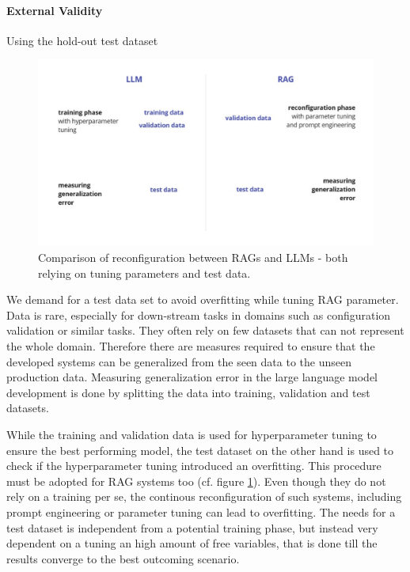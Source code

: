 \paragraph{External Validity}

Using the hold-out test dataset

\begin{figure}
    \centering
    \includegraphics[width=\textwidth]{images/RAGvsLLM-tuning.pdf}
    \caption{Comparison of reconfiguration between RAGs and LLMs - both relying on tuning parameters and test data.}
    \label{fig:tuning}
\end{figure}



We demand for a test data set to avoid overfitting while tuning RAG parameter. Data is rare, especially for down-stream tasks in domains such as configuration validation or similar tasks. They often rely on few datasets that can not represent the whole domain. Therefore there are measures required to ensure that the developed systems can be generalized from the seen data to the unseen production data. Measuring generalization error in the large language model development is done by splitting the data into training, validation and test datasets. 

While the training and validation data is used for hyperparameter tuning to ensure the best performing model, the test dataset on the other hand is used to check if the hyperparameter tuning introduced an overfitting. This procedure must be adopted for RAG systems too (cf. figure \ref{fig:tuning}). Even though they do not rely on a training per se, the continous reconfiguration of such systems, including prompt engineering or parameter tuning can lead to overfitting. The needs for a test dataset is independent from a potential training phase, but instead very dependent on a tuning an high amount of free variables, that is done till the results converge to the best outcoming scenario.

